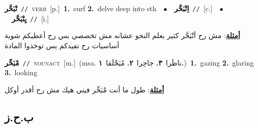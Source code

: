 \documentclass[10pt,a4paper,twoside]{article} %
\begin{document}
\begin{multicols}{2}
{\setlength\topsep{0pt}\textbf{\foreignlanguage{arabic}{تْبَحَّر}}\ {\color{gray}\texttt{//}\color{black}}\ \textsc{verb}\ [p.]\ \textbf{1.}~surf  \textbf{2.}~delve deep into sth\ \ $\bullet$\ \ \setlength\topsep{0pt}\textbf{\foreignlanguage{arabic}{اِتْبَحَّر}}\ {\color{gray}\texttt{//}\color{black}}\ [c.]\ \ $\bullet$\ \ \setlength\topsep{0pt}\textbf{\foreignlanguage{arabic}{يِتْبَحَّر}}\ {\color{gray}\texttt{//}\color{black}}\ [i.]\  \begin{flushright}\color{gray}\foreignlanguage{arabic}{\textbf{\underline{\foreignlanguage{arabic}{أمثلة}}}: مش رح أتْبَحَّر كثير بعلم النحو عشانه مش تخصصي بس رح أعطيكم شوية أساسيات رح تفيدكم بس توخذوا المادة}\end{flushright}\color{black}} \vspace{2mm}

{\setlength\topsep{0pt}\textbf{\foreignlanguage{arabic}{مْبَحِّر}}\ {\color{gray}\texttt{//}\color{black}}\ \textsc{noun\textunderscore act}\ [m.]\ \color{gray}(msa. \foreignlanguage{arabic}{ناظَرا}~\foreignlanguage{arabic}{\textbf{٣.}}  \foreignlanguage{arabic}{جاحِرا}~\foreignlanguage{arabic}{\textbf{٢.}}  \foreignlanguage{arabic}{مُبَحْلَقا}~\foreignlanguage{arabic}{\textbf{١.}})\color{black}\ \textbf{1.}~gazing  \textbf{2.}~glaring  \textbf{3.}~looking\  \begin{flushright}\color{gray}\foreignlanguage{arabic}{\textbf{\underline{\foreignlanguage{arabic}{أمثلة}}}: طول ما أنت مْبَحِّر فيني هيك مش رح أقدر أوكل}\end{flushright}\color{black}} \vspace{2mm}

\vspace{-3mm}
\subsection*{\color{blue}\foreignlanguage{arabic}{ب.ح.ز}\color{blue}{}} 


\end{multicols}
\end{document}
